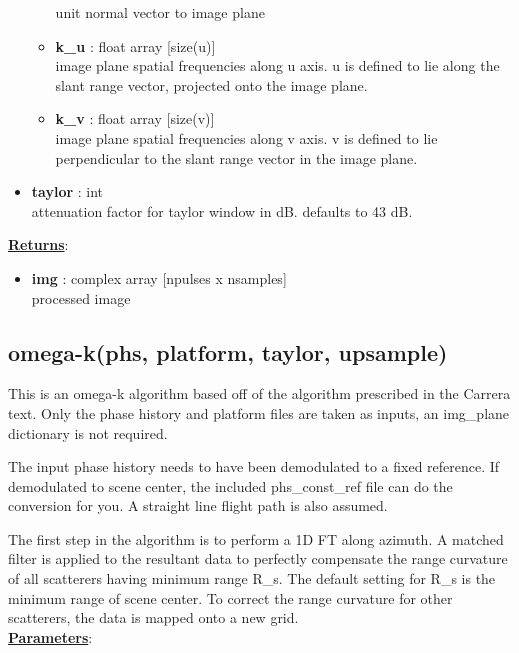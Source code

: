 \documentclass{article}
\newcommand{\defs}[2]{\textbf{{#1}} : {#2}}
\begin{document}
\begin{itemize}
\begin{itemize}
	    	unit normal vector to image plane
	    \item \defs{k\_u}{float array [size(u)]}\\
	    	image plane spatial frequencies along u axis.  u is defined to lie along the slant range vector, projected onto the image plane.
	    \item \defs{k\_v}{float array [size(v)]}\\
	    	image plane spatial frequencies along v axis.  v is defined to lie perpendicular to the slant range vector in the image plane.
	\end{itemize}
	\item\defs{taylor}{int}\\
	attenuation factor for taylor window in dB.  defaults to 43 dB.
\end{itemize}

\noindent \underline{\textbf{Returns}}:
\begin{itemize}
	\item \defs{img}{complex array [npulses x nsamples]}\\
	processed image
\end{itemize}

\subsection{omega-k(phs, platform, taylor, upsample)}
This is an omega-k algorithm based off of the algorithm prescribed in the Carrera text.  Only the phase history and platform files are taken as inputs, an img\_plane dictionary is not required. 

The input phase history needs to have been demodulated to a fixed reference.  If demodulated to scene center, the included phs\_const\_ref file can do the conversion for you.  A straight line flight path is also assumed.

The first step in the algorithm is to perform a 1D FT along azimuth.  A matched filter is applied to the resultant data to perfectly compensate the range curvature of all scatterers having minimum range R\_s.  The default setting for R\_s is the minimum range of scene center.  To correct the range curvature for other scatterers, the data is mapped onto a new grid.\\

\noindent \underline{\textbf{Parameters}}:
\end{document}

